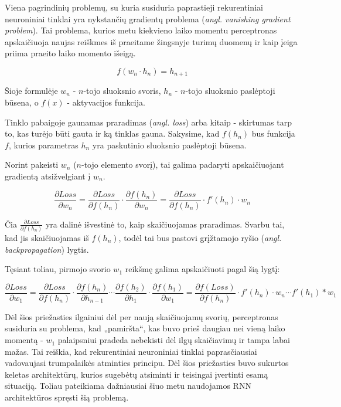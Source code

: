 \documentclass{VUMIFPSbakalaurinis}
\begin{document}
Viena pagrindinių problemų, su kuria susiduria paprastieji rekurentiniai neuroniniai tinklai yra nykstančių gradientų problema (\textit{angl. vanishing gradient problem}). Tai problema, kurios metu kiekvieno laiko momentu perceptronas apskaičiuoja naujas reiškmes iš praeitame žingsnyje turimų duomenų ir kaip įeiga priima praeito laiko momento išeigą. 

\begin{equation}
	f(w_n \cdot h_n)=h_{n+1}
\end{equation}

Šioje formulėje $w_n$ - $n$-tojo sluoksnio svoris, $h_n$ - $n$-tojo sluoksnio paslėptoji būsena, o $f(x)$ - aktyvacijos funkcija.

Tinklo pabaigoje gaunamas praradimas (\textit{angl. loss}) arba kitaip - skirtumas tarp to, kas turėjo būti gauta ir ką tinklas gauna. Sakysime, kad $f(h_n)$ bus funkcija $f$, kurios parametras $h_n$ yra paskutinio sluoksnio paslėptoji būsena.

Norint pakeisti $w_n$ ($n$-tojo elemento svorį), tai galima padaryti apskaičiuojant gradientą atsižvelgiant į $w_n$.

\begin{equation}
	\frac{\partial Loss}{\partial w_n} = \frac{\partial Loss}{\partial f(h_n)} \cdot \frac{\partial f(h_n)}{\partial w_n} = \frac{\partial Loss}{\partial f(h_n)} \cdot f'(h_n) \cdot w_n
\end{equation}

Čia $\frac{\partial Loss}{\partial f(h_n)}$ yra dalinė išvestinė to, kaip skaičiuojamas praradimas. Svarbu tai, kad jis skaičiuojamas iš $f(h_n)$, todėl tai bus pastovi grįžtamojo ryšio (\textit{angl. backpropagation}) lygtis.

Tęsiant toliau, pirmojo svorio $w_1$ reikšmę galima apskaičiuoti pagal šią lygtį:

\begin{equation}
\frac{\partial Loss}{\partial w_1} = \frac{\partial Loss}{\partial f(h_n)} \cdot \frac{\partial f(h_n)}{\partial h_{n-1}} \cdots \frac{\partial f(h_2)}{\partial h_1} \cdot \frac{\partial f(h_1)}{\partial w_1} = \frac{\partial f(Loss)}{\partial f(h_n)} \cdot f'(h_n) \cdot w_n \cdots f'(h_1) * w_1
\end{equation}

Dėl šios priežasties ilgainiui dėl per naują skaičiuojamų svorių, perceptronas susiduria su problema, kad „pamiršta“, kas buvo prieš daugiau nei vieną laiko momentą - $w_1$ palaipsniui pradeda nebekisti dėl ilgų skaičiavimų ir tampa labai mažas. Tai reiškia, kad rekurentiniai neuroniniai tinklai paprasčiausiai vadovaujasi trumpalaikės atminties principu. Dėl šios priežasties buvo sukurtos keletas architektūrų, kurios sugebėtų atsiminti ir teisingai įvertinti esamą situaciją. Toliau pateikiama dažniausiai šiuo metu naudojamos RNN architektūros spręsti šią problemą.
\end{document}
